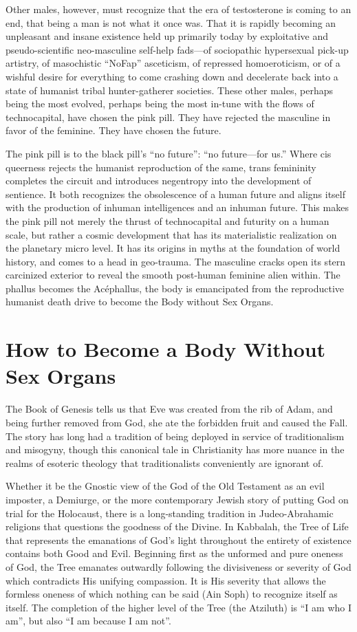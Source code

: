 \documentclass[10pt, statementpaper, twoside, openright]{memoir}
\begin{document}
Other males, however, must recognize that the era of testosterone is coming to an end, that being a man is not what it once was. That it is rapidly becoming an unpleasant and insane existence held up primarily today by exploitative and pseudo-scientific neo-masculine self-help fads---of sociopathic hypersexual pick-up artistry, of masochistic ``NoFap'' asceticism, of repressed homoeroticism, or of a wishful desire for everything to come crashing down and decelerate back into a state of humanist tribal hunter-gatherer societies. These other males, perhaps being the most evolved, perhaps being the most in-tune with the flows of technocapital, have chosen the pink pill. They have rejected the masculine in favor of the feminine. They have chosen the future.

The pink pill is to the black pill's ``no future'': ``no future---for us.'' Where cis queerness rejects the humanist reproduction of the same, trans femininity completes the circuit and introduces negentropy into the development of sentience. It both recognizes the obsolescence of a human future and aligns itself with the production of inhuman intelligences and an inhuman future. This makes the pink pill not merely the thrust of technocapital and futurity on a human scale, but rather a cosmic development that has its materialistic realization on the planetary micro level. It has its origins in myths at the foundation of world history, and comes to a head in geo-trauma. The masculine cracks open its stern carcinized exterior to reveal the smooth post-human feminine alien within. The phallus becomes the Acéphallus, the body is emancipated from the reproductive humanist death drive to become the Body without Sex Organs.

\chapter{How to Become a Body Without Sex Organs}

The Book of Genesis tells us that Eve was created from the rib of Adam, and being further removed from God, she ate the forbidden fruit and caused the Fall. The story has long had a tradition of being deployed in service of traditionalism and misogyny, though this canonical tale in Christianity has more nuance in the realms of esoteric theology that traditionalists conveniently are ignorant of.

Whether it be the Gnostic view of the God of the Old Testament as an evil imposter, a Demiurge, or the more contemporary Jewish story of putting God on trial for the Holocaust, there is a long-standing tradition in Judeo-Abrahamic religions that questions the goodness of the Divine. In Kabbalah, the Tree of Life that represents the emanations of God's light throughout the entirety of existence contains both Good and Evil. Beginning first as the unformed and pure oneness of God, the Tree emanates outwardly following the divisiveness or severity of God which contradicts His unifying compassion. It is His severity that allows the formless oneness of which nothing can be said (Ain Soph) to recognize itself as itself. The completion of the higher level of the Tree (the Atziluth) is ``I am who I am'', but also ``I am because I am not''.
\end{document}

